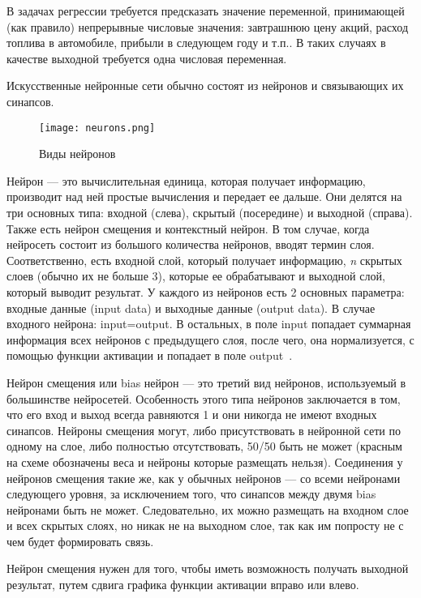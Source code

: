 В задачах регрессии требуется предсказать значение переменной, принимающей (как правило) непрерывные числовые
значения: завтрашнюю цену акций, расход топлива в автомобиле, прибыли в следующем году и т.п.. В таких случаях в
качестве выходной требуется одна числовая переменная.

Искусственные нейронные сети обычно состоят из нейронов и связывающих их синапсов.

\begin{figure}[!ht]
  \centering
  \texttt{[image: neurons.png]} 
  \caption{Виды нейронов}
  \label{fig:analysis:neurons}
\end{figure}

Нейрон — это вычислительная единица, которая получает информацию, производит над ней простые вычисления и передает ее
дальше. Они делятся на три основных типа: входной (слева), скрытый (посередине) и выходной (справа). Также есть нейрон
смещения и контекстный нейрон. В том случае, когда нейросеть состоит из большого количества нейронов, вводят термин
слоя. Соответственно, есть входной слой, который получает информацию, \emph{n} скрытых слоев (обычно их не больше 3),
которые ее обрабатывают и выходной слой, который выводит результат. У каждого из нейронов есть 2 основных параметра:
входные данные (input data) и выходные данные (output data). В случае входного нейрона: input=output. В остальных,
в поле input попадает суммарная информация всех нейронов с предыдущего слоя, после чего, она нормализуется, с помощью
функции активации и попадает в поле output~\cite{neural-networks}.

Нейрон смещения или bias нейрон — это третий вид нейронов, используемый в большинстве нейросетей. Особенность этого
типа нейронов заключается в том, что его вход и выход всегда равняются 1 и они никогда не имеют входных синапсов.
Нейроны смещения могут, либо присутствовать в нейронной сети по одному на слое, либо полностью отсутствовать,
50/50 быть не может (красным на схеме обозначены веса и нейроны которые размещать нельзя). Соединения у нейронов
смещения такие же, как у обычных нейронов — со всеми нейронами следующего уровня, за исключением того, что синапсов
между двумя bias нейронами быть не может. Следовательно, их можно размещать на входном слое и всех скрытых слоях,
но никак не на выходном слое, так как им попросту не с чем будет формировать связь.

Нейрон смещения нужен для того, чтобы иметь возможность получать выходной результат, путем сдвига графика функции
активации вправо или влево.

